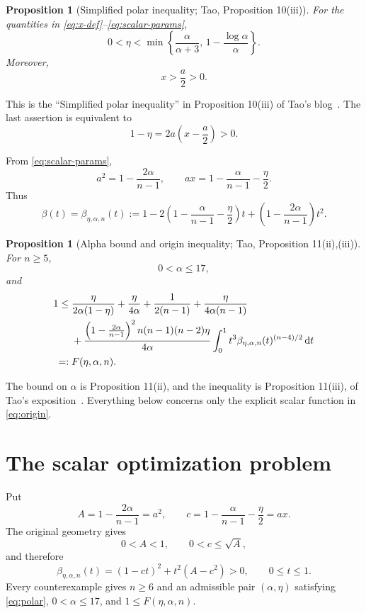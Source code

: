 \documentclass[11pt]{amsart}
\newtheorem{proposition}[theorem]{Proposition}
\theoremstyle{definition}
\newcommand{\dd}{\,\mathrm d}
\begin{document}
\begin{proposition}[Simplified polar inequality; Tao, Proposition 10(iii)]\label{prop:polar}
For the quantities in \eqref{eq:x-def}--\eqref{eq:scalar-params},
\begin{equation}\label{eq:polar}
 0<\eta<\min\left\{
 \frac{\alpha}{\alpha+3},\,
 1-\frac{\log\alpha}{\alpha}
 \right\}.
\end{equation}
Moreover,
\[
 x>\frac a2>0.
\]
\end{proposition}

This is the ``Simplified polar inequality'' in Proposition 10(iii) of Tao's blog~\cite{TaoDigestion2026}.  The last assertion is equivalent to
\[
 1-\eta=2a\left(x-\frac a2\right)>0.
\]

From \eqref{eq:scalar-params},
\[
 a^2=1-\frac{2\alpha}{n-1},\qquad
 ax=1-\frac{\alpha}{n-1}-\frac\eta2.
\]
Thus
\begin{equation}\label{eq:beta-eta-alpha-n}
 \beta(t)=\beta_{\eta,\alpha,n}(t)
 :=1-2\left(1-\frac{\alpha}{n-1}-\frac\eta2\right)t
 +\left(1-\frac{2\alpha}{n-1}\right)t^2.
\end{equation}

\begin{proposition}[Alpha bound and origin inequality; Tao, Proposition 11(ii),(iii)]\label{prop:origin}
For $n\ge5$,
\[
 0<\alpha\le17,
\]
and
\begin{align}
1\le{}&
 \frac{\eta}{2\alpha(1-\eta)}
 +\frac{\eta}{4\alpha}
 +\frac1{2(n-1)}
 +\frac{\eta}{4\alpha(n-1)}\notag\\
&+\frac{\left(1-\frac{2\alpha}{n-1}\right)^2
 n(n-1)(n-2)\eta}{4\alpha}
 \int_0^1 t^3
 \beta_{\eta,\alpha,n}(t)^{(n-4)/2}\dd t\notag\\
=:{}&F(\eta,\alpha,n).
\label{eq:origin}
\end{align}
\end{proposition}

The bound on $\alpha$ is Proposition 11(ii), and the inequality is Proposition 11(iii), of Tao's exposition~\cite{TaoDigestion2026}.  Everything below concerns only the explicit scalar function in \eqref{eq:origin}.

\section{The scalar optimization problem}\label{sec:optimization}

Put
\[
 A=1-\frac{2\alpha}{n-1}=a^2,
 \qquad
 c=1-\frac{\alpha}{n-1}-\frac\eta2=ax.
\]
The original geometry gives
\[
 0<A<1,
 \qquad 0<c\le\sqrt A,
\]
and therefore
\begin{equation}\label{eq:beta-positive}
 \beta_{\eta,\alpha,n}(t)
 =(1-ct)^2+t^2(A-c^2)>0,
 \qquad 0\le t\le1.
\end{equation}
Every counterexample gives $n\ge6$ and an admissible pair $(\alpha,\eta)$ satisfying \eqref{eq:polar}, $0<\alpha\le17$, and $1\le F(\eta,\alpha,n)$.
\end{document}
